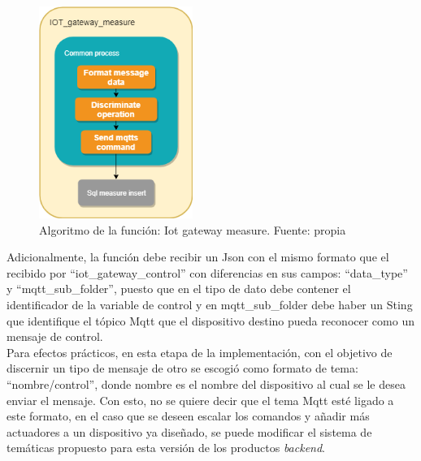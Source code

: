\begin{figure}[htbp]
	\centerline{\includegraphics[width=5cm]{figuras/algoritmo_iot_measure.png}}
	\caption{Algoritmo de la función: Iot gateway measure. Fuente: propia}
	\label{fig_31}
\end{figure}

Adicionalmente, la función debe recibir un Json con el mismo formato que el recibido por ``iot\_gateway\_control'' con diferencias en sus campos: ``data\_type'' y ``mqtt\_sub\_folder'', puesto que en el tipo de dato debe contener el identificador de la variable de control y en mqtt\_sub\_folder debe haber un Sting que identifique el tópico Mqtt que el dispositivo destino pueda reconocer como un mensaje de control. 
\vspace{0.5cm}\\
Para efectos prácticos, en esta etapa de la implementación, con el objetivo de discernir un tipo de mensaje de otro se escogió como formato de tema: ``{nombre}/control'', donde {nombre} es el nombre del dispositivo al cual se le desea enviar el mensaje. Con esto, no se quiere decir que el tema Mqtt esté ligado a este formato, en el caso que se deseen escalar los comandos y añadir más actuadores a un dispositivo ya diseñado, se puede modificar el sistema de temáticas propuesto para esta versión de los productos \textit{backend}.

